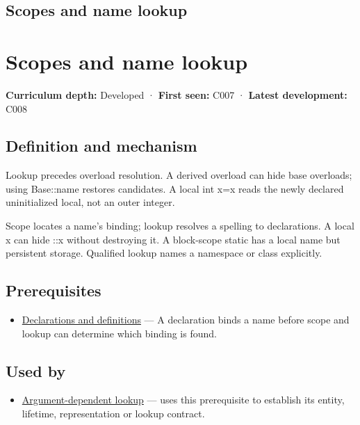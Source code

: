 \hypertarget{appendix-b12b31759da1}{}
\section*{Scopes and name lookup}
\chapter{Scopes and name lookup}\label{appendix-b12b31759da1-scopes-and-name-lookup}

\textbf{Curriculum depth:} Developed · \textbf{First seen:} C007 · \textbf{Latest development:} C008

\section{Definition and mechanism}\label{appendix-b12b31759da1-definition-and-mechanism}

Lookup precedes overload resolution. A derived overload can hide base overloads; using Base::name restores candidates. A local int x=x reads the newly declared uninitialized local, not an outer integer.

Scope locates a name's binding; lookup resolves a spelling to declarations. A local x can hide ::x without destroying it. A block-scope static has a local name but persistent storage. Qualified lookup names a namespace or class explicitly.

\section{Prerequisites}\label{appendix-b12b31759da1-prerequisites}

\begin{itemize}
\tightlist
\item
  \hyperref[appendix-2e4d494c2d94]{Declarations and definitions} --- A declaration binds a name before scope and lookup can determine which binding is found.
\end{itemize}

\section{Used by}\label{appendix-b12b31759da1-used-by}

\begin{itemize}
\tightlist
\item
  \hyperref[appendix-7863714aa97f]{Argument-dependent lookup} --- uses this prerequisite to establish its entity, lifetime, representation or lookup contract.
\end{itemize}

